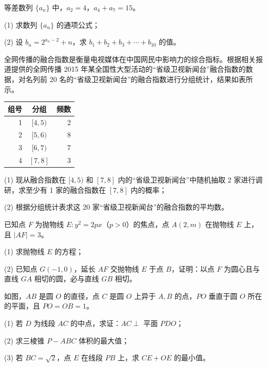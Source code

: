 \begin{question}

等差数列 \(\{a_n\}\) 中，\(a_2=4\)，\(a_4+a_7=15\)。

(1) 求数列 \(\{a_n\}\) 的通项公式；

(2) 设 \(b_n=2^{a_n-2}+n\)，求 \(b_1+b_2+b_3+\cdots+b_{10}\) 的值。

\end{question}
\begin{question}

全网传播的融合指数是衡量电视媒体在中国网民中影响力的综合指标。根据相关报道提供的全网传播 2015 年某全国性大型活动的“省级卫视新闻台”融合指数的数据，对名列前 20 名的“省级卫视新闻台”的融合指数进行分组统计，结果如表所示。

\begin{center}
\begin{tabular}{rcr}
\toprule
组号 & 分组 & 频数 \\
\midrule
1 & \([4,5)\) & 2 \\
2 & \([5,6)\) & 8 \\
3 & \([6,7)\) & 7 \\
4 & \([7,8]\) & 3 \\
\bottomrule
\end{tabular}
\end{center}

(1) 现从融合指数在 \([4,5)\) 和 \([7,8]\) 内的“省级卫视新闻台”中随机抽取 2 家进行调研，求至少有 1 家的融合指数在 \([7,8]\) 内的概率；

(2) 根据分组统计表求这 20 家“省级卫视新闻台”的融合指数的平均数。

\Needspace{0.4\textheight}
\end{question}
\begin{question}

已知点 \(F\) 为抛物线 \(E:y^2=2px\)（\(p>0\)）的焦点，点 \(A(2,m)\) 在抛物线 \(E\) 上，且 \(|AF|=3\)。

(1) 求抛物线 \(E\) 的方程；

(2) 已知点 \(G(-1,0)\)，延长 \(AF\) 交抛物线 \(E\) 于点 \(B\)，证明：以点 \(F\) 为圆心且与直线 \(GA\) 相切的圆，必与直线 \(GB\) 相切。
\nopagebreak[4]
\begin{center}\end{center}
\nopagebreak[4]
\Needspace{0.4\textheight}
\end{question}
\begin{question}

如图，\(AB\) 是圆 \(O\) 的直径，点 \(C\) 是圆 \(O\) 上异于 \(A,B\) 的点，\(PO\) 垂直于圆 \(O\) 所在的平面，且 \(PO=OB=1\)。

(1) 若 \(D\) 为线段 \(AC\) 的中点，求证：\(AC\perp\) 平面 \(PDO\)；

(2) 求三棱锥 \(P-ABC\) 体积的最大值；

(3) 若 \(BC=\sqrt2\)，点 \(E\) 在线段 \(PB\) 上，求 \(CE+OE\) 的最小值。
\nopagebreak[4]
\begin{center}\end{center}
\nopagebreak[4]
\end{question}
